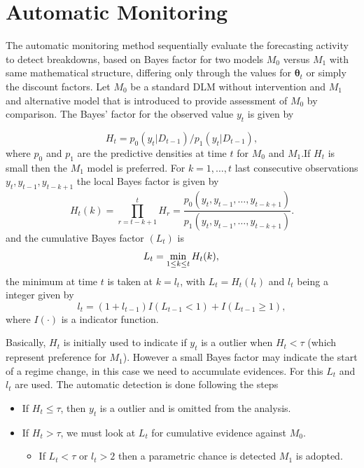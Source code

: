 \documentclass[
]{article}
\providecommand{\tightlist}{%
  \setlength{\itemsep}{0pt}\setlength{\parskip}{0pt}}
\begin{document}
\hypertarget{automatic-monitoring}{%
\section{Automatic Monitoring}\label{automatic-monitoring}}

The automatic monitoring method sequentially evaluate the forecasting
activity to detect breakdowns, based on Bayes factor for two models
\(M_0\) versus \(M_1\) with same mathematical structure, differing only
through the values for \(\boldsymbol{\theta}_t\) or simply the discount
factors. Let \(M_0\) be a standard DLM without intervention and \(M_1\)
and alternative model that is introduced to provide assessment of
\(M_0\) by comparison. The Bayes' factor for the observed value \(y_t\)
is given by

\[
H_t = p_0(y_t \vert D_{t-1}) / p_1(y_t \vert D_{t-1}),
\] where \(p_0\) and \(p_1\) are the predictive densities at time \(t\)
for \(M_0\) and \(M_1\).If \(H_t\) is small then the \(M_1\) model is
preferred. For \(k=1, \dots, t\) last consecutive observations
\(y_t, y_{t-1}, y_{t-k+1}\) the local Bayes factor is given by \[
H_t(k) = \prod_{r=t-k+1}^t H_r = \frac{p_0 (y_t, y_{t-1}, \dots, y_{t-k+1})}{p_1 (y_t, y_{t-1}, \dots, y_{t-k+1})}.
\] and the cumulative Bayes factor \((L_t)\) is \[
L_t = \min_{1\leq k \leq t} H_t(k), \\
\] the minimum at time \(t\) is taken at \(k=l_t\), with
\(L_t = H_t(l_t)\) and \(l_t\) being a integer given by \[
l_t = (1+l_{t-1}) I(L_{t-1} < 1) + I(L_{t-1} \geq 1),
\] where \(I(\cdot)\) is a indicator function.

Basically, \(H_t\) is initially used to indicate if \(y_t\) is a outlier
when \(H_t < \tau\) (which represent preference for \(M_1\)). However a
small Bayes factor may indicate the start of a regime change, in this
case we need to accumulate evidences. For this \(L_t\) and \(l_t\) are
used. The automatic detection is done following the steps

\begin{itemize}
\tightlist
\item
  If \(H_t \leq \tau\), then \(y_t\) is a outlier and is omitted from
  the analysis.
\item
  If \(H_t > \tau\), we must look at \(L_t\) for cumulative evidence
  against \(M_0\).

  \begin{itemize}
  \tightlist
  \item
    If \(L_t < \tau\) or \(l_t > 2\) then a parametric chance is
    detected \(M_1\) is adopted.
  \end{itemize}
\end{itemize}
\end{document}
